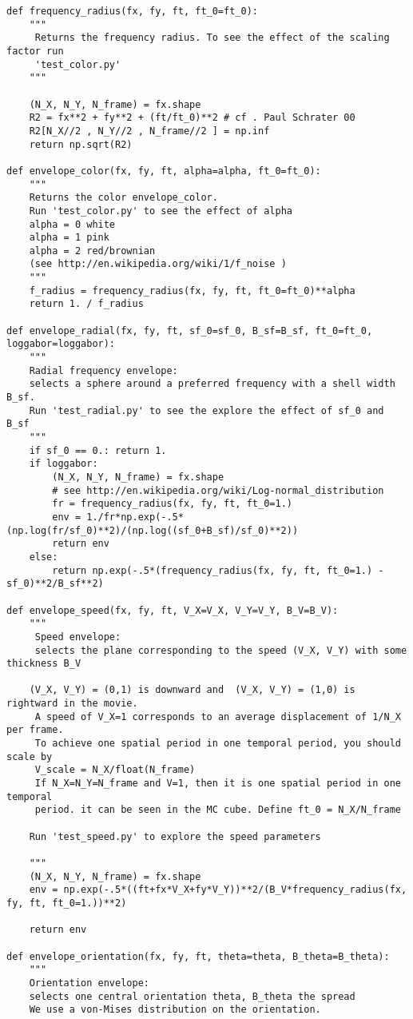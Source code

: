\documentclass[a4paper,11pt]{article}%
\begin{document}
\begin{lstlisting}
def frequency_radius(fx, fy, ft, ft_0=ft_0):
    """
     Returns the frequency radius. To see the effect of the scaling factor run
     'test_color.py'
    """
    
    (N_X, N_Y, N_frame) = fx.shape
    R2 = fx**2 + fy**2 + (ft/ft_0)**2 # cf . Paul Schrater 00
    R2[N_X//2 , N_Y//2 , N_frame//2 ] = np.inf 
    return np.sqrt(R2)

def envelope_color(fx, fy, ft, alpha=alpha, ft_0=ft_0):
    """
    Returns the color envelope_color. 
    Run 'test_color.py' to see the effect of alpha
    alpha = 0 white
    alpha = 1 pink
    alpha = 2 red/brownian
    (see http://en.wikipedia.org/wiki/1/f_noise )
    """
    f_radius = frequency_radius(fx, fy, ft, ft_0=ft_0)**alpha
    return 1. / f_radius

def envelope_radial(fx, fy, ft, sf_0=sf_0, B_sf=B_sf, ft_0=ft_0, loggabor=loggabor):
    """
    Radial frequency envelope:
    selects a sphere around a preferred frequency with a shell width B_sf.
    Run 'test_radial.py' to see the explore the effect of sf_0 and B_sf
    """
    if sf_0 == 0.: return 1.
    if loggabor:
        (N_X, N_Y, N_frame) = fx.shape
        # see http://en.wikipedia.org/wiki/Log-normal_distribution
        fr = frequency_radius(fx, fy, ft, ft_0=1.)
        env = 1./fr*np.exp(-.5*(np.log(fr/sf_0)**2)/(np.log((sf_0+B_sf)/sf_0)**2))
        return env
    else:
        return np.exp(-.5*(frequency_radius(fx, fy, ft, ft_0=1.) - sf_0)**2/B_sf**2)

def envelope_speed(fx, fy, ft, V_X=V_X, V_Y=V_Y, B_V=B_V):
    """
     Speed envelope:
     selects the plane corresponding to the speed (V_X, V_Y) with some thickness B_V

    (V_X, V_Y) = (0,1) is downward and  (V_X, V_Y) = (1,0) is rightward in the movie.
     A speed of V_X=1 corresponds to an average displacement of 1/N_X per frame.
     To achieve one spatial period in one temporal period, you should scale by
     V_scale = N_X/float(N_frame)
     If N_X=N_Y=N_frame and V=1, then it is one spatial period in one temporal
     period. it can be seen in the MC cube. Define ft_0 = N_X/N_frame

    Run 'test_speed.py' to explore the speed parameters

    """
    (N_X, N_Y, N_frame) = fx.shape
    env = np.exp(-.5*((ft+fx*V_X+fy*V_Y))**2/(B_V*frequency_radius(fx, fy, ft, ft_0=1.))**2)
    
    return env

def envelope_orientation(fx, fy, ft, theta=theta, B_theta=B_theta):
    """
    Orientation envelope:
    selects one central orientation theta, B_theta the spread
    We use a von-Mises distribution on the orientation.


\end{lstlisting}
\end{document}
